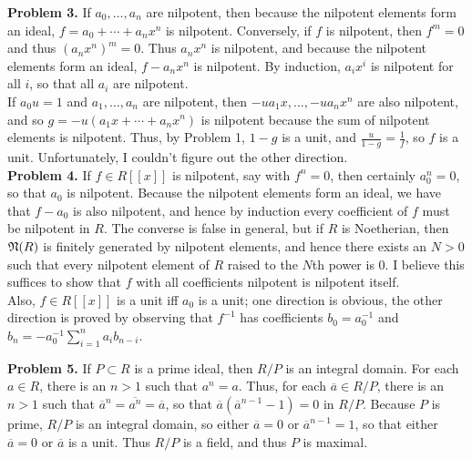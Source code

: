\documentclass[11pt]{article}
\newcommand{\num}[1]{\noindent \textbf{#1}}
\theoremstyle{definition}
\begin{document}
\num{Problem 3.} If $a_0,\ldots,a_n$ are nilpotent, then because the nilpotent
elements form an ideal, $f=a_0+\cdots+a_nx^n$ is nilpotent. Conversely,
if $f$ is nilpotent, then $f^m=0$ and thus $(a_nx^n)^m=0$. Thus $a_nx^n$
is nilpotent, and because the nilpotent elements form an ideal, $f-a_nx^n$
is nilpotent. By induction, $a_ix^i$ is nilpotent for all $i$, so that all
$a_i$ are nilpotent.\\

If $a_0u=1$ and $a_1,\ldots,a_n$ are nilpotent, then $-ua_1x,\ldots,-ua_nx^n$
are also nilpotent, and so $g=-u(a_1x+\cdots+a_nx^n)$ is nilpotent because
the sum of nilpotent elements is nilpotent. Thus, by Problem 1, $1-g$ is
a unit, and $\frac{u}{1-g}=\frac{1}{f}$, so $f$ is a unit. Unfortunately,
I couldn't figure out the other direction.    \\

\num{Problem 4.} If $f\in R[[x]]$ is nilpotent, say with $f^n=0$, then
certainly $a_0^n=0$, so that $a_0$ is nilpotent. Because the nilpotent elements
form an ideal, we have that $f-a_0$ is also nilpotent, and hence by induction
every coefficient of $f$ must be nilpotent in $R$. The converse is false in
general, but if $R$ is Noetherian, then $\frak{N}(R)$ is finitely generated by
nilpotent elements, and hence there exists an $N>0$ such that every nilpotent
element of $R$ raised to the $N$th power is 0. I believe this suffices to
show that $f$ with all coefficients nilpotent is nilpotent itself. \\

Also, $f\in R[[x]]$ is a unit iff $a_0$ is a unit; one direction is obvious,
the other direction is proved by observing that $f^{-1}$ has coefficients
$b_0=a_0^{-1}$ and $b_n=-a_0^{-1}\sum_{i=1}^n a_ib_{n-i}$.    \\

\pagebreak

\num{Problem 5.} If $P\subset R$ is a prime ideal, then $R/P$
is an integral domain. For each $a\in R$, there is an $n>1$ such
that $a^n=a$. Thus, for each $\overline{a}\in R/P$, there is an
$n>1$ such that $\overline{a}^n=\overline{a^n}=\overline{a}$, so that
$\overline{a}(\overline{a}^{n-1}-1)=0$ in $R/P$. Because $P$ is prime, $R/P$
is an integral domain, so either $\overline{a}=0$ or $\overline{a}^{n-1}=1$,
so that either $\overline{a}=0$ or $\overline{a}$ is a unit. Thus $R/P$
is a field, and thus $P$ is maximal. \\
\end{document}
